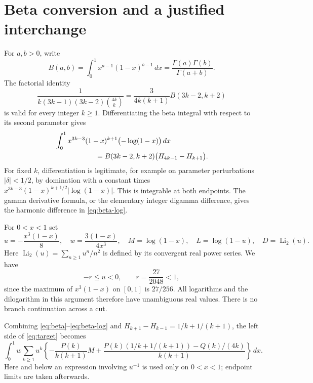 \documentclass[11pt,a4paper]{article}
\newcommand{\Li}{\operatorname{Li}_2}
\numberwithin{equation}{section}
\begin{document}
\section{Beta conversion and a justified interchange}
For $a,b>0$, write
\[
 B(a,b)=\int_0^1x^{a-1}(1-x)^{b-1}\,dx
       =\frac{\Gamma(a)\Gamma(b)}{\Gamma(a+b)}.
\]
The factorial identity
\begin{equation}\label{eq:beta}
 \frac{1}{k(3k-1)(3k-2)\binom{4k}{k}}
 =\frac{3}{4k(k+1)}B(3k-2,k+2)
\end{equation}
is valid for every integer $k\ge1$. Differentiating the beta integral with respect to its second parameter gives
\begin{align}
 &\int_0^1x^{3k-3}(1-x)^{k+1}\bigl(-\log(1-x)\bigr)\,dx\notag\\
 &\hspace{20mm}=B(3k-2,k+2)\bigl(H_{4k-1}-H_{k+1}\bigr).
 \label{eq:beta-log}
\end{align}
For fixed $k$, differentiation is legitimate, for example on parameter perturbations $|\delta|<1/2$, by domination with a constant times
$x^{3k-3}(1-x)^{k+1/2}|\log(1-x)|$. This is integrable at both endpoints. The gamma derivative formula, or the elementary integer digamma difference, gives the harmonic difference in \eqref{eq:beta-log}.

For $0<x<1$ set
\begin{equation}\label{eq:variables}
 u=-\frac{x^3(1-x)}8,\quad
 w=\frac{3(1-x)}{4x^3},\quad
 M=\log(1-x),\quad L=\log(1-u),\quad D=\Li(u).
\end{equation}
Here $\Li(u)=\sum_{n\ge1}u^n/n^2$ is defined by its convergent real power series. We have
\begin{equation}\label{eq:domain}
 -r\le u<0,\qquad r=\frac{27}{2048}<1,
\end{equation}
since the maximum of $x^3(1-x)$ on $[0,1]$ is $27/256$. All logarithms and the dilogarithm in this argument therefore have unambiguous real values. There is no branch continuation across a cut.

Combining \eqref{eq:beta}--\eqref{eq:beta-log} and
$H_{k+1}-H_{k-1}=1/k+1/(k+1)$, the left side of \eqref{eq:target} becomes
\begin{equation}\label{eq:sum-integral}
 \int_0^1w\sum_{k\ge1}u^k\left\{
 -\frac{P(k)}{k(k+1)}M+
 \frac{P(k)(1/k+1/(k+1))-Q(k)/(4k)}{k(k+1)}
 \right\}\,dx.
\end{equation}
Here and below an expression involving $u^{-1}$ is used only on $0<x<1$; endpoint limits are taken afterwards.
\end{document}
